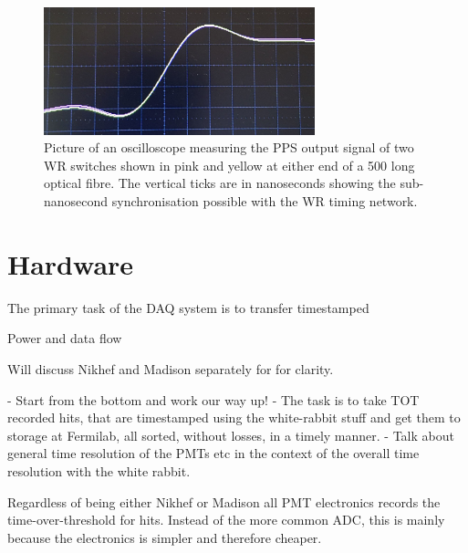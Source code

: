 \begin{figure} %
    \includegraphics[width=0.7\textwidth]{diagrams/5-daq/sync.jpg}
    \caption[Picture of White Rabbit timing synchronisation seen in \chips.]
    {Picture of an oscilloscope measuring the PPS output signal of two WR switches shown in pink
        and yellow at either end of a \unit{500}{} long optical fibre. The vertical
        ticks are in nanoseconds showing the sub-nanosecond synchronisation possible with the WR
        timing network.}
    \label{fig:sync}
\end{figure}

\section{Hardware} %
\label{sec:daq_hard} %

The primary task of the DAQ system is to transfer timestamped


Power and data flow

Will discuss Nikhef and Madison separately for for clarity.

- Start from the bottom and work our way up!
- The task is to take TOT recorded hits, that are timestamped using the white-rabbit stuff and get
them to storage at Fermilab, all sorted, without losses, in a timely manner.
- Talk about general time resolution of the PMTs etc in the context of the overall time resolution
with the white rabbit.

Regardless of being either Nikhef or Madison all PMT electronics records the time-over-threshold
for hits. Instead of the more common ADC, this is mainly because the electronics is simpler and
therefore cheaper.

